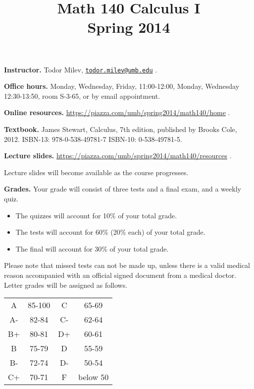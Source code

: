 \documentclass{article}
\title{Math 140 Calculus I \\ Spring 2014}
\begin{document}
\maketitle

\noindent \textbf{Instructor.} Todor Milev, \href{mailto:todor.milev@umb.edu}{\nolinkurl{todor.milev@umb.edu}} \quad \quad \quad .

\medskip
\noindent \textbf{Office hours. } Monday, Wednesday, Friday, 11:00-12:00, Monday, Wednesday 12:30-13:50, room S-3-65, or by email appointment.

\medskip
\noindent \textbf{Online resources. }  \url{https://piazza.com/umb/spring2014/math140/home}  \quad \quad \quad .


\medskip\noindent \textbf{Textbook. }  James Stewart, Calculus, 7th edition, published by Brooks Cole, 2012. ISBN-13: 978-0-538-49781-7
ISBN-10: 0-538-49781-5.

\medskip \noindent \textbf{Lecture slides. } \url{https://piazza.com/umb/spring2014/math140/resources} \quad \quad \quad .

\medskip\noindent Lecture slides will become available as the course progresses.



\medskip
\noindent \textbf{Grades.} Your grade will consist of three tests and a final exam, and a weekly quiz. 
\begin{itemize}
\item The quizzes will account for 10\% of your total grade.
\item The tests will account for 60\% (20\% each) of your total grade.
\item The final will account for 30\% of your total grade.
\end{itemize}
Please note that missed tests can not be made up, unless there is a valid medical reason accompanied with an official signed document from a medical doctor. Letter grades will be assigned as follows. 

\begin{center}
\begin{tabular}{cc|cc}
A & 85-100 & C & 65-69 \\
A-& 82-84 & C- & 62-64 \\
B+& 80-81 & D+ & 60-61 \\
B & 75-79& D & 55-59\\
B-& 72-74& D- & 50-54\\
C+& 70-71& F & below 50\\
\end{tabular}

\end{center}
\end{document}
